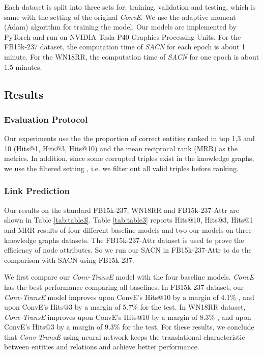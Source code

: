 \documentclass[letterpaper]{article} \usepackage{aaai19}  \usepackage{times}  \usepackage{helvet}  \usepackage{courier}  \usepackage{url}  \usepackage{graphicx}  \usepackage{amsmath}
\begin{document}
Each dataset is split into three sets for: training, validation and testing, which is same with the setting of the original {\it ConvE}.
We use the adaptive moment (Adam) algorithm \cite{kingma2014adam} for training the model.  Our models are implemented by PyTorch and run on NVIDIA Tesla P40 Graphics Processing Units.
For the FB15k-237 dataset, the computation time of {\it SACN} for each epoch is about 1 minute. For the WN18RR, the computation time of {\it SACN} for one epoch is about 1.5 minutes.


\subsection{Results}
\subsubsection{Evaluation Protocol} 
Our experiments use the the proportion of correct entities ranked in top 1,3 and 10 (Hits@1, Hits@3, Hits@10) and the mean reciprocal rank (MRR) as the metrics. In addition, since some corrupted triples exist in the knowledge graphs, we use the filtered setting \cite{bordes2013translating}, i.e. we filter out all valid triples before ranking.

\subsubsection{Link Prediction}
Our results on the standard FB15k-237, WN18RR and FB15k-237-Attr are shown in Table \ref{tab:table3}.
Table \ref{tab:table3} reports Hits@10, Hits@3, Hits@1 and MRR results of four different baseline models and two our models on three knowledge graphs datasets. The FB15k-237-Attr dataset is used to prove the efficiency of node attributes. 
So we run our SACN in FB15k-237-Attr to do the comparison with SACN using FB15k-237.

We first compare our {\it Conv-TransE} model with the four baseline models. {\it ConvE} has the best performance comparing all baselines.  In FB15k-237 dataset, our {\it Conv-TransE} model improves upon ConvE's Hits@10 by a margin of 4.1\% , and upon ConvE's Hits@3 by a margin of 5.7\% for the test. In WN18RR dataset, {\it Conv-TransE} improves upon ConvE's Hits@10 by a margin of 8.3\% , and upon ConvE's Hits@3 by a margin of 9.3\% for the test. For these results, we conclude that {\it Conv-TransE} using neural network keeps the translational characteristic between entities and relations and achieve better performance.
\end{document}
